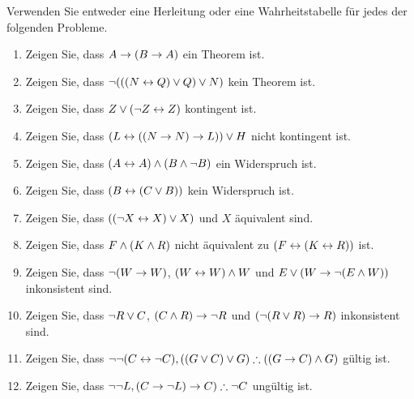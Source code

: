 \noindent\problempart Verwenden Sie entweder eine Herleitung oder eine Wahrheitstabelle für jedes der folgenden Probleme.  
\begin{enumerate}%
\item Zeigen Sie, dass $A \rightarrow (B \rightarrow A)$ ein Theorem ist.
\item Zeigen Sie, dass $\neg (((N \leftrightarrow Q) \vee Q) \vee N)$ kein Theorem ist.
\item Zeigen Sie, dass $Z \vee (\neg Z \leftrightarrow Z) $ kontingent ist.
\item Zeigen Sie, dass $ (L \leftrightarrow ((N \rightarrow N) \rightarrow L)) \vee H $ nicht kontingent ist.
\item Zeigen Sie, dass $ (A \leftrightarrow A) \wedge (B \wedge \neg B)$ ein Widerspruch ist.
\item Zeigen Sie, dass $ (B \leftrightarrow (C \vee B)) $ kein Widerspruch ist.
\item Zeigen Sie, dass $((\neg X \leftrightarrow X) \vee X)$ und $X$ äquivalent sind.
\item Zeigen Sie, dass $F \wedge (K \wedge R)$ nicht äquivalent zu $ (F \leftrightarrow (K \leftrightarrow R))$ ist.
\item Zeigen Sie, dass $ \neg (W \rightarrow W)$, $(W \leftrightarrow W) \wedge W$ und $E \vee (W \rightarrow \neg (E \wedge W))$ inkonsistent sind.
\item Zeigen Sie, dass $\neg R \vee C $, $(C \wedge R) \rightarrow \neg R$ und $(\neg (R \vee R) \rightarrow R)$ inkonsistent sind.
\item Zeigen Sie, dass $\enot \enot (C \eiff \enot C), ((G \eor C) \eor G) \therefore ((G \eif C) \eand G) $ gültig ist.
\item Zeigen Sie, dass $ \enot \enot L,  (C \eif \enot L) \eif C) \therefore \enot C$ ungültig ist. 
\end{enumerate}

